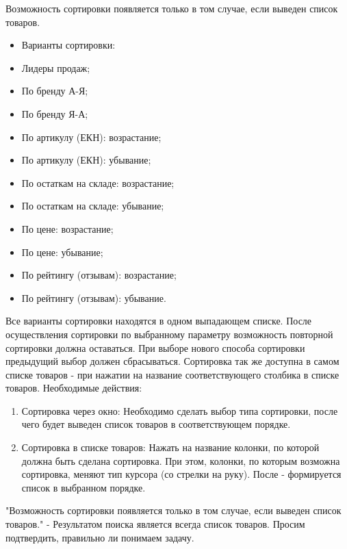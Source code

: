 {

\begin{wikilong}
	Возможность сортировки появляется только в том случае, если выведен список товаров.
	\begin{itemize}
		\item Варианты сортировки:
		\item Лидеры продаж;
		\item По бренду А-Я;
		\item По бренду Я-А;
		\item По артикулу (ЕКН): возрастание;
		\item По артикулу (ЕКН): убывание;
		\item По остаткам на складе: возрастание;
		\item По остаткам на складе: убывание;
		\item По цене: возрастание;
		\item По цене: убывание;
		\item По рейтингу (отзывам): возрастание;
		\item По рейтингу (отзывам): убывание.
	\end{itemize}
	Все варианты сортировки находятся в одном выпадающем списке.
	После осуществления сортировки по выбранному параметру возможность повторной сортировки должна оставаться.
	При выборе нового способа сортировки предыдущий выбор должен сбрасываться.
	Сортировка так же доступна в самом списке товаров - при нажатии на название соответствующего столбика в списке товаров.
	Необходимые действия:
	\begin{enumerate}
		\item Сортировка через окно:
		Необходимо сделать выбор типа сортировки, после чего будет выведен список товаров в соответствующем порядке.
		\item Сортировка в списке товаров:
		Нажать на название колонки, по которой должна быть сделана сортировка. При этом, колонки, по которым возможна сортировка, меняют тип курсора (со стрелки на руку). После - формируется список в выбранном порядке.
	\end{enumerate}
\end{wikilong}

\begin{teamidea}

"Возможность сортировки появляется только в том случае, если выведен список товаров." - Результатом поиска является всегда список товаров. Просим подтвердить, правильно ли понимаем задачу.


\end{teamidea}}
